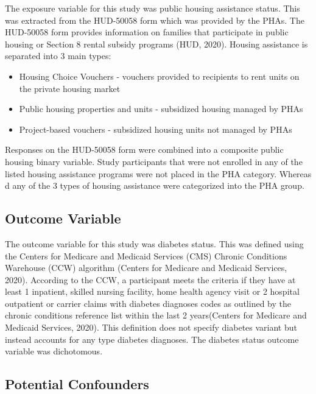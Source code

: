 \documentclass [11pt, proquest] {uwthesis}[2015/03/03]
\providecommand{\tightlist}{%
  \setlength{\itemsep}{0pt}\setlength{\parskip}{0pt}}
\begin{document}
The exposure variable for this study was public housing assistance
status. This was extracted from the HUD-50058 form which was provided by
the PHAs. The HUD-50058 form provides information on families that
participate in public housing or Section 8 rental subsidy programs (HUD,
2020). Housing assistance is separated into 3 main types:
\begin{itemize}
\tightlist
\item
  Housing Choice Vouchers - vouchers provided to recipients to rent
  units on the private housing market
\item
  Public housing properties and units - subsidized housing managed by
  PHAs
\item
  Project-based vouchers - subsidized housing units not managed by PHAs
\end{itemize}
Responses on the HUD-50058 form were combined into a composite public
housing binary variable. Study participants that were not enrolled in
any of the listed housing assistance programs were not placed in the PHA
category. Whereas d any of the 3 types of housing assistance were
categorized into the PHA group.

\subsection{Outcome Variable}\label{outcome-variable}

The outcome variable for this study was diabetes status. This was
defined using the Centers for Medicare and Medicaid Services (CMS)
Chronic Conditions Warehouse (CCW) algorithm (Centers for Medicare and
Medicaid Services, 2020). According to the CCW, a participant meets the
criteria if they have at least 1 inpatient, skilled nursing facility,
home health agency visit or 2 hospital outpatient or carrier claims with
diabetes diagnoses codes as outlined by the chronic conditions reference
list within the last 2 years(Centers for Medicare and Medicaid Services,
2020). This definition does not specify diabetes variant but instead
accounts for any type diabetes diagnoses. The diabetes status outcome
variable was dichotomous.

\subsection{Potential Confounders}\label{potential-confounders}
\end{document}
